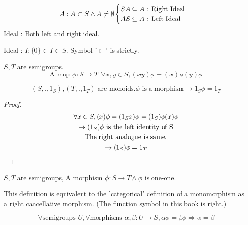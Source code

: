 \begin{Def}
    \[
        A: A \subset S \wedge A \neq \emptyset \space
        \begin{cases}
            SA \subseteq A \text{\space : Right Ideal}  \\
            AS \subseteq A \text{\space : Left Ideal }  \\
        \end{cases}
    \]
    Ideal : Both left and right ideal.
\end{Def}


\begin{Def}[Proper]
    Ideal : $I: \{0\} \subset I \subset S$. Symbol '$\subset$'  is strictly. 
\end{Def}

\begin{Def}
    $S,T$ are semigroups.
    \[
        \text{A map }\phi: S \rightarrow T, \forall x,y \in S,(xy)\phi=(x)\phi(y)\phi
    \]
\end{Def}

\begin{Rmk}
    \[
        (S,.,1_S),(T,.,1_T)\text{ are monoids.}
        \phi \text{ is a morphism} \rightarrow
        1_S\phi =1_T
    \]   
    \begin{proof}
        \begin{gather*}
            \forall x \in S, (x) \phi = (1_S x) \phi =(1_S) \phi (x) \phi   \\
            \rightarrow (1_S) \phi \text{\space is the left identity of S}  \\
            \text{The right analogue is same.}  \\
            \rightarrow (1_S) \phi = 1_T
        \end{gather*}
    \end{proof}
\end{Rmk}

\begin{Def}[Monomorphism]
    $S,T$ are semigroups, A morphism $\phi : S \rightarrow T \wedge \phi$ is one-one.
    
    This definition is equivalent to the 'categorical' definition of a monomorphism as a right cancellative morphism. (The function symbol in this book is right.)

    \[
        \forall \text{semigroups } U, \forall \text{morphisms } \alpha, \beta : U \rightarrow S, \alpha \phi = \beta \phi \Rightarrow \alpha = \beta
    \]
\end{Def}

